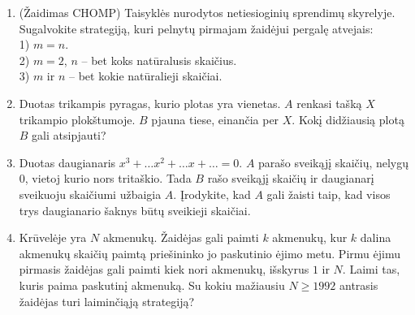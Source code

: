 \begin{enumerate}
  \item(Žaidimas CHOMP) Taisyklės nurodytos netiesioginių sprendimų skyrelyje.
    Sugalvokite strategiją, kuri pelnytų pirmajam žaidėjui pergalę atvejais: \\
    1) $m=n$. \\
    2) $m=2$, $n$ -- bet koks natūralusis skaičius.\\
    3) $m$ ir $n$ – bet kokie natūralieji skaičiai.

  \item Duotas trikampis pyragas, kurio plotas yra vienetas. $A$ renkasi tašką
    $X$ trikampio plokštumoje. $B$ pjauna tiese, einančia per $X$. Kokį
    didžiausią plotą $B$ gali atsipjauti?

  \item Duotas daugianaris $x^3+\dots x^2+\dots x+ \dots=0$. $A$ parašo
    sveikąjį skaičių, nelygų $0$, vietoj kurio nors tritaškio. Tada $B$ rašo
    sveikąjį skaičių ir daugianarį sveikuoju skaičiumi užbaigia $A$.
    Įrodykite, kad $A$ gali žaisti taip, kad visos trys daugianario šaknys būtų
    sveikieji skaičiai.

  \item {} Krūvelėje yra $N$ akmenukų.
    Žaidėjas gali paimti $k$ akmenukų, kur $k$ dalina akmenukų skaičių paimtą
    priešininko jo paskutinio ėjimo metu. Pirmu ėjimu pirmasis žaidėjas gali
    paimti kiek nori akmenukų, išskyrus $1$ ir $N$. Laimi tas, kuris paima
    paskutinį akmenuką. Su kokiu mažiausiu $N\geq 1992$ antrasis žaidėjas
    turi laiminčiąją strategiją?


\end{enumerate}
